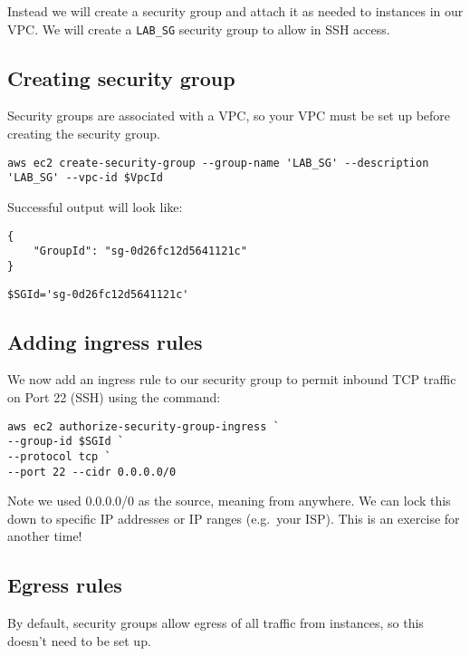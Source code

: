 \documentclass{pgnotes}
\begin{document}
Instead we will create a security group and attach it as needed to
instances in our VPC. We will create a \texttt{LAB\_SG} security group
to allow in SSH access.

\subsection{Creating security group}\label{sec:creating-security-group}

Security groups are associated with a VPC, so your VPC must be set up
before creating the security group.

\begin{verbatim}
aws ec2 create-security-group --group-name 'LAB_SG' --description 'LAB_SG' --vpc-id $VpcId
\end{verbatim}

Successful output will look like:

\begin{verbatim}
{
    "GroupId": "sg-0d26fc12d5641121c"
}
\end{verbatim}

\begin{verbatim}
$SGId='sg-0d26fc12d5641121c'
\end{verbatim}

\subsection{Adding ingress rules}\label{adding-ingress-rules}

We now add an ingress rule to our security group to permit inbound TCP
traffic on Port 22 (SSH) using the command:

\begin{verbatim}
aws ec2 authorize-security-group-ingress `
--group-id $SGId `
--protocol tcp `
--port 22 --cidr 0.0.0.0/0
\end{verbatim}

Note we used 0.0.0.0/0 as the source, meaning from anywhere. We can lock
this down to specific IP addresses or IP ranges (e.g.~your ISP). This is
an exercise for another time!

\subsection{Egress rules}\label{egress-rules}

By default, security groups allow egress of all traffic from instances,
so this doesn't need to be set up.
\end{document}
